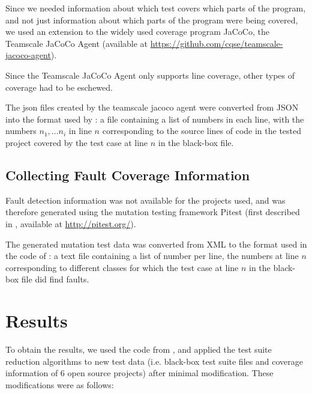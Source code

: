 Since we needed information about which test covers which parts
of the program, and not just information about which parts of the
program were being covered, we used an extension to the widely used
coverage program JaCoCo, the Teamscale JaCoCo Agent (available at
\url{https://github.com/cqse/teamscale-jacoco-agent}).

Since the Teamscale JaCoCo Agent only supports line coverage, other
types of coverage had to be eschewed.

The json files created by the teamscale jacoco agent were converted
from JSON into the format used by \cite{cruciani2019scalable}: a file
containing a list of numbers in each line, with the numbers $n_1, \dots
n_i$ in line $n$ corresponding to the source lines of code in the tested
project covered by the test case at line $n$ in the black-box file.

\subsection{Collecting Fault Coverage Information}

Fault detection information was not available for the projects used, and
was therefore generated using the mutation testing framework Pitest (first
described in \cite{coles2016pit}, available at \url{http://pitest.org/}).

The generated mutation test data was converted from XML to the format
used in the code of \cite{cruciani2019scalable}: a text file containing
a list of number per line, the numbers at line $n$ corresponding to
different classes for which the test case at line $n$ in the black-box
file did find faults.

\section{Results}

To obtain the results, we used the code from \cite{cruciani2019scalable},
and applied the test suite reduction algorithms to new test data
(i.e. black-box test suite files and coverage information of 6 open source
projects) after minimal modification. These modifications were as follows:

